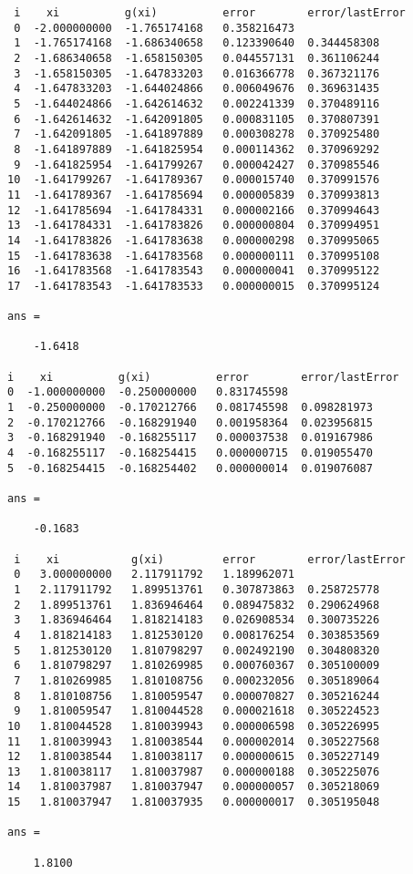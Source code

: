 \documentclass{article}
\begin{document}
\begin{lstlisting}
 i    xi          g(xi)          error        error/lastError
 0  -2.000000000  -1.765174168   0.358216473
 1  -1.765174168  -1.686340658   0.123390640  0.344458308
 2  -1.686340658  -1.658150305   0.044557131  0.361106244
 3  -1.658150305  -1.647833203   0.016366778  0.367321176
 4  -1.647833203  -1.644024866   0.006049676  0.369631435
 5  -1.644024866  -1.642614632   0.002241339  0.370489116
 6  -1.642614632  -1.642091805   0.000831105  0.370807391
 7  -1.642091805  -1.641897889   0.000308278  0.370925480
 8  -1.641897889  -1.641825954   0.000114362  0.370969292
 9  -1.641825954  -1.641799267   0.000042427  0.370985546
10  -1.641799267  -1.641789367   0.000015740  0.370991576
11  -1.641789367  -1.641785694   0.000005839  0.370993813
12  -1.641785694  -1.641784331   0.000002166  0.370994643
13  -1.641784331  -1.641783826   0.000000804  0.370994951
14  -1.641783826  -1.641783638   0.000000298  0.370995065
15  -1.641783638  -1.641783568   0.000000111  0.370995108
16  -1.641783568  -1.641783543   0.000000041  0.370995122
17  -1.641783543  -1.641783533   0.000000015  0.370995124

ans =

    -1.6418

i    xi          g(xi)          error        error/lastError
0  -1.000000000  -0.250000000   0.831745598
1  -0.250000000  -0.170212766   0.081745598  0.098281973
2  -0.170212766  -0.168291940   0.001958364  0.023956815
3  -0.168291940  -0.168255117   0.000037538  0.019167986
4  -0.168255117  -0.168254415   0.000000715  0.019055470
5  -0.168254415  -0.168254402   0.000000014  0.019076087

ans =

    -0.1683

 i    xi           g(xi)         error        error/lastError
 0   3.000000000   2.117911792   1.189962071
 1   2.117911792   1.899513761   0.307873863  0.258725778
 2   1.899513761   1.836946464   0.089475832  0.290624968
 3   1.836946464   1.818214183   0.026908534  0.300735226
 4   1.818214183   1.812530120   0.008176254  0.303853569
 5   1.812530120   1.810798297   0.002492190  0.304808320
 6   1.810798297   1.810269985   0.000760367  0.305100009
 7   1.810269985   1.810108756   0.000232056  0.305189064
 8   1.810108756   1.810059547   0.000070827  0.305216244
 9   1.810059547   1.810044528   0.000021618  0.305224523
10   1.810044528   1.810039943   0.000006598  0.305226995
11   1.810039943   1.810038544   0.000002014  0.305227568
12   1.810038544   1.810038117   0.000000615  0.305227149
13   1.810038117   1.810037987   0.000000188  0.305225076
14   1.810037987   1.810037947   0.000000057  0.305218069
15   1.810037947   1.810037935   0.000000017  0.305195048

ans =

    1.8100
\end{lstlisting}
\end{document}
